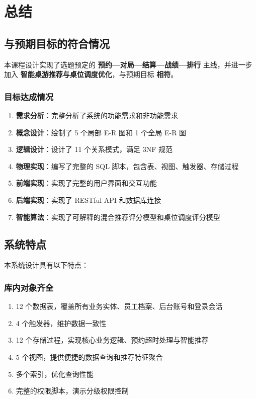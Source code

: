 \chapter{总结}

\section{与预期目标的符合情况}

本课程设计实现了选题预定的 \textbf{预约—对局—结算—战绩—排行} 主线，并进一步加入 \textbf{智能桌游推荐与桌位调度优化}，与预期目标 \textbf{相符}。

\subsection{目标达成情况}

\begin{enumerate}
  \item \textbf{需求分析}：完整分析了系统的功能需求和非功能需求
  \item \textbf{概念设计}：绘制了 5 个局部 E-R 图和 1 个全局 E-R 图
  \item \textbf{逻辑设计}：设计了 11 个关系模式，满足 3NF 规范
  \item \textbf{物理实现}：编写了完整的 SQL 脚本，包含表、视图、触发器、存储过程
  \item \textbf{前端实现}：实现了完整的用户界面和交互功能
  \item \textbf{后端实现}：实现了 RESTful API 和数据库连接
  \item \textbf{智能算法}：实现了可解释的混合推荐评分模型和桌位调度评分模型
\end{enumerate}

\section{系统特点}

本系统设计具有以下特点：

\subsection{库内对象齐全}

\begin{enumerate}
  \item 12 个数据表，覆盖所有业务实体、员工档案、后台账号和登录会话
  \item 4 个触发器，维护数据一致性
  \item 12 个存储过程，实现核心业务逻辑、预约超时处理与智能推荐
  \item 5 个视图，提供便捷的数据查询和推荐特征聚合
  \item 多个索引，优化查询性能
  \item 完整的权限脚本，演示分级权限控制
\end{enumerate}

